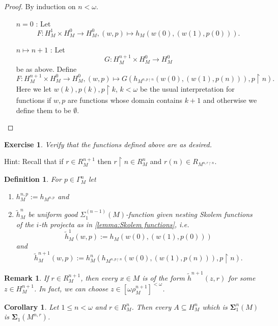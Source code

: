 \documentclass[12pt,a4paper]{article}
\theoremstyle{nicestyle}
\newtheorem{exercise}{Exercise}[subsection]
\newtheorem{definition}{Definition}[subsection]
\newtheorem{corollary}{Corollary}[subsection]
\newtheorem{remark}{Remark}[subsection]
\begin{document}
\begin{proof}
  By induction on $n < \omega$.
  \begin{itemize}
  \item[$n=0$ :] Let
    \[
      F \colon H^{1}_{M} \times H^{0}_{M} \to H^{0}_{M}, (w,p) \mapsto
      h_{M}(w(0),(w(1), p(0))).
    \]
  \item[$n \mapsto n+1$ :] Let
    \[
      G \colon H^{n+1}_{M} \times H^{0}_{M} \to H^{0}_{M}
    \]
    be as above. Define
    \[
      F \colon H^{n+1}_{M} \times H^{0}_{M} \to H^{0}_{M}, (w,p)
      \mapsto G(h_{M^{n, p \restriction n}}(w(0), (w(1), p(n))), p \restriction n).
    \]
    Here we let $w(k), p(k), p \restriction k$, $k < \omega$ be the
    usual interpretation for functions if $w,p$ are functions whose
    domain contains $k + 1$ and otherwise we define them to be
    $\emptyset$.
  \end{itemize}
\end{proof}

\begin{exercise}
  Verify that the functions defined above are as desired.
\end{exercise}

Hint: Recall that if $r \in R^{n+1}_M$ then
$r \restriction n \in R^{n}_M$ and
$r(n) \in R_{M^{n, r \restriction n}}$.

\begin{definition}
  For $p \in \Gamma^{n}_{M}$ let
  \begin{enumerate}
    \item $h^{n,p}_{M} := h_{M^{n,p}}$ and
    \item $\tilde{h}^{n}_{M}$ be uniform good
      $\Sigma^{(n-1)}_{1}(M)$-function given nesting Skolem functions
      of the $i$-th projecta as in \autoref{lemma:Skolem functions},
      i.e.
      \[
        \tilde{h}^{1}_{M}(w, p) := h_{M}(w(0), (w(1), p(0)))
      \]
      and
      \[
	\tilde{h}^{n+1}_{M}(w, p) := h^{n}_{M}( h_{M^{n, p
            \restriction n}}(w(0), (w(1), p(n))), p \restriction n).
      \]      
    \end{enumerate}
\end{definition}
\begin{remark}
  If $r \in R^{n+1}_{M}$, then every $x \in M$ is of the form
  $\tilde{h}^{n+1}(z, r)$ for some $z \in H^{n+1}_{M}$. In fact, we
  can choose $z \in [\omega \rho^{n+1}_{M}]^{<\omega}$.
\end{remark}

\begin{corollary} \label{cor:definability via very good parameters}
  Let $1 \le n < \omega$ and $r \in R^{n}_{M}$. Then every
  $A \subseteq H^{n}_{M}$ which is $\boldsymbol{\Sigma}^{n}_{1}(M)$ is
  $\boldsymbol{\Sigma}_{1}(M^{n,r})$.
\end{corollary}
\end{document}

